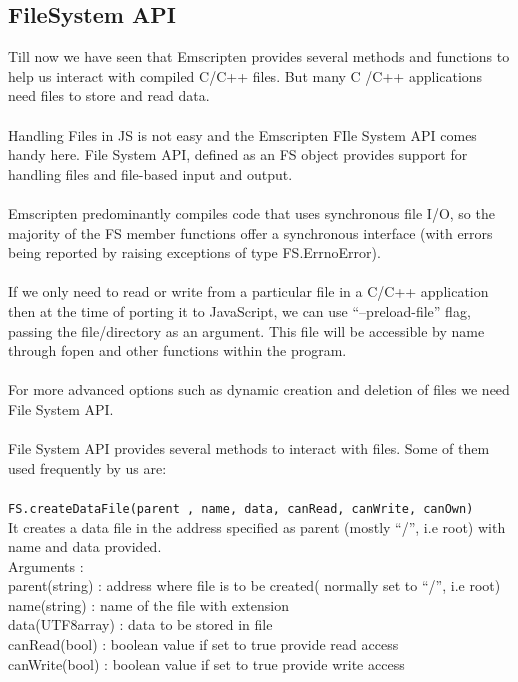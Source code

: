 \documentclass[12pt]{article}
\newcommand\tab[1][1cm]{\hspace*{#1}}
\begin{document}
\subsection{FileSystem API}
Till now we have seen that Emscripten provides several methods and functions to help us interact with compiled C/C++ files. But many C /C++ applications need files to store and read data.\\ \\ 
Handling Files in JS is not easy and the Emscripten FIle System API comes handy here. File System API, defined as an FS object provides support for handling files and file-based input and output.\\ \\
Emscripten predominantly compiles code that uses synchronous file I/O, so the majority of the FS member functions offer a synchronous interface (with errors being reported by raising exceptions of type FS.ErrnoError).\cite{EmscriptenFS}
\\ \\
If we only need to read or write from a particular file in a C/C++ application then at the time of porting it to JavaScript, we can use “--preload-file” flag, passing the file/directory as an argument. This file will be accessible by name through fopen and other functions within the program.\\ \\
For more advanced options such as dynamic creation and deletion of files we need File System API.\\ \\
File System API provides several methods to interact with files. Some of them used frequently by us are: \\ \\
\texttt{FS.createDataFile(parent , name, data, canRead, canWrite, canOwn)}\\
It creates a data file in the address specified as parent (mostly “/”, i.e root) with name and data provided.\\
Arguments :\\
\tab parent(string) : address where file is to be created( normally set to “/”, i.e root)\\
\tab name(string) : name of the file with extension \\
\tab data(UTF8array) : data to be stored in file\\
\tab canRead(bool) : boolean value if set to true provide read access\\
\tab canWrite(bool) : boolean value if set to true provide write access\\
\end{document}
